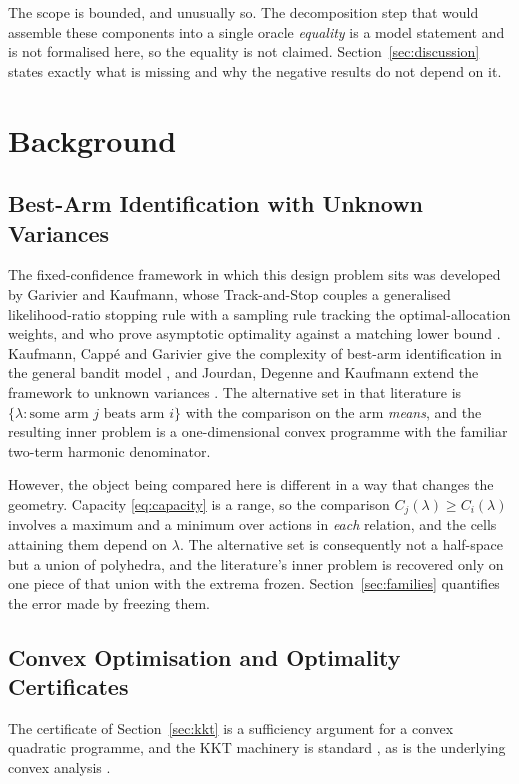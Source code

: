 The scope is bounded, and unusually so. The decomposition step that would assemble these
components into a single oracle \emph{equality} is a model statement and is not formalised
here, so the equality is not claimed. Section~\ref{sec:discussion} states exactly what is
missing and why the negative results do not depend on it.

\section{Background}

\subsection{Best-Arm Identification with Unknown Variances}

The fixed-confidence framework in which this design problem sits was developed by Garivier
and Kaufmann, whose Track-and-Stop couples a generalised likelihood-ratio stopping rule with
a sampling rule tracking the optimal-allocation weights, and who prove asymptotic optimality
against a matching lower bound \cite{garivier2016}. Kaufmann, Capp\'e and Garivier give the
complexity of best-arm identification in the general bandit model \cite{kaufmann2016}, and
Jourdan, Degenne and Kaufmann extend the framework to unknown variances \cite{jourdan2023}.
The alternative set in that literature is $\{\lambda:\text{some arm }j\text{ beats arm }i\}$
with the comparison on the arm \emph{means}, and the resulting inner problem is a
one-dimensional convex programme with the familiar two-term harmonic denominator.

However, the object being compared here is different in a way that changes the geometry.
Capacity \eqref{eq:capacity} is a range, so the comparison $C_{j}(\lambda)\ge C_{i}(\lambda)$
involves a maximum and a minimum over actions in \emph{each} relation, and the cells
attaining them depend on $\lambda$. The alternative set is consequently not a half-space but
a union of polyhedra, and the literature's inner problem is recovered only on one piece of
that union with the extrema frozen. Section~\ref{sec:families} quantifies the error made by
freezing them.

\subsection{Convex Optimisation and Optimality Certificates}

The certificate of Section~\ref{sec:kkt} is a sufficiency argument for a convex quadratic
programme, and the KKT machinery is standard \cite{boyd2004}, as is the underlying convex
analysis \cite{rockafellar1970}.

